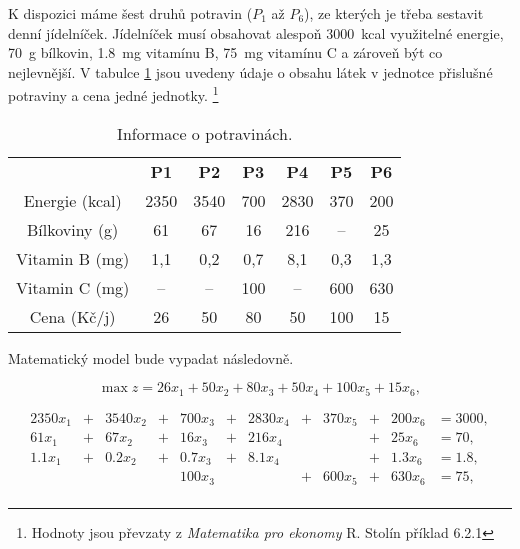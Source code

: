 K dispozici máme šest druhů potravin ($P_1$ až $P_6$), ze kterých je třeba sestavit denní jídelníček.
Jídelníček musí obsahovat alespoň \SI{3000}{kcal} využitelné energie,
\SI{70}{g} bílkovin,
\SI{1,8}{mg} vitamínu B,
\SI{75}{mg} vitamínu C a zároveň být co nejlevnější.
V tabulce \ref{tab:potraviny} jsou uvedeny údaje o obsahu látek v jednotce přislušné potraviny a cena jedné jednotky.
\footnote{Hodnoty jsou převzaty z \textit{Matematika pro ekonomy} R. Stolín \cite{matematika_pro_ekonomy} příklad 6.2.1}
\begin{table}[H]
    \centering
    \begin{tabular}{|c|c|c|c|c|c|c|}
        \hline
        \textbf{} & \textbf{P1} & \textbf{P2} & \textbf{P3} & \textbf{P4} & \textbf{P5} & \textbf{P6} \\
        \hhline{|=|=|=|=|=|=|=|}
        Energie (\si{kcal}) & 2350 & 3540 & 700 & 2830 & 370 & 200\\
        \hline
        Bílkoviny (\si{g}) & 61 & 67 & 16 & 216 & -- & 25\\
        \hline
        Vitamin B (\si{mg}) & 1,1 & 0,2 & 0,7 & 8,1 & 0,3 & 1,3\\
        \hline
        Vitamin C (\si{mg}) & -- & -- & 100 & -- & 600 & 630\\
        \hline
        Cena (Kč/j) & 26 & 50 & 80 & 50 & 100 & 15\\
        \hline
    \end{tabular}
    \caption{Informace o potravinách.}
    \label{tab:potraviny}
\end{table}

Matematický model bude vypadat následovně.


\begin{equation*}
    \max z = 26x_1 + 50x_2 + 80x_3 + 50x_4 + 100x_5 + 15x_6,
\end{equation*}


\begin{equation}
    \begin{aligned}
    2350x_1 &+ &3540x_2 &+ &700x_3 &+ &2830x_4 &+ &370x_5 &+ &200x_6 &= 3000, \\
    61x_1 &+ &67x_2 &+ &16x_3 &+ &216x_4 && &+ &25x_6 &= 70, \\
    1.1x_1 &+ &0.2x_2 &+ &0.7x_3 &+ &8.1x_4 && &+ &1.3x_6 &= 1.8, \\
    &&&& 100x_3 && &+ &600x_5 &+ &630x_6 &= 75, \\
    \end{aligned}
\end{equation}

